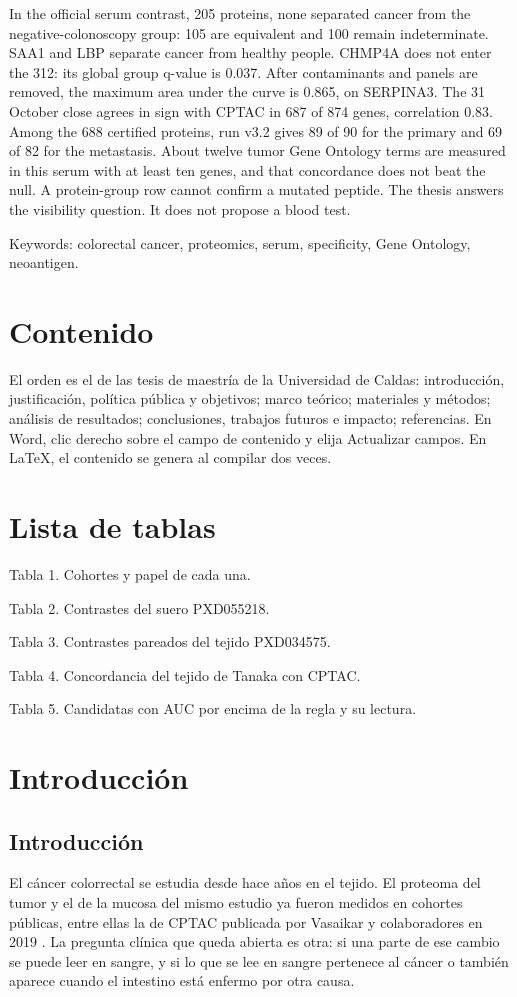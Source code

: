 \documentclass[12pt,oneside]{report}
\begin{document}
In the official serum contrast, 205 proteins, none separated cancer from the negative-colonoscopy group: 105 are equivalent and 100 remain indeterminate. SAA1 and LBP separate cancer from healthy people. CHMP4A does not enter the 312: its global group q-value is 0.037. After contaminants and panels are removed, the maximum area under the curve is 0.865, on SERPINA3. The 31 October close agrees in sign with CPTAC in 687 of 874 genes, correlation 0.83. Among the 688 certified proteins, run v3.2 gives 89 of 90 for the primary and 69 of 82 for the metastasis. About twelve tumor Gene Ontology terms are measured in this serum with at least ten genes, and that concordance does not beat the null. A protein-group row cannot confirm a mutated peptide. The thesis answers the visibility question. It does not propose a blood test.

Keywords: colorectal cancer, proteomics, serum, specificity, Gene Ontology, neoantigen.

\chapter*{Contenido}
El orden es el de las tesis de maestría de la Universidad de Caldas: introducción, justificación, política pública y objetivos; marco teórico; materiales y métodos; análisis de resultados; conclusiones, trabajos futuros e impacto; referencias. En Word, clic derecho sobre el campo de contenido y elija Actualizar campos. En LaTeX, el contenido se genera al compilar dos veces.

\chapter*{Lista de tablas}
Tabla 1. Cohortes y papel de cada una.

Tabla 2. Contrastes del suero PXD055218.

Tabla 3. Contrastes pareados del tejido PXD034575.

Tabla 4. Concordancia del tejido de Tanaka con CPTAC.

Tabla 5. Candidatas con AUC por encima de la regla y su lectura.

\chapter{Introducción}
\section{Introducción}
El cáncer colorrectal se estudia desde hace años en el tejido. El proteoma del tumor y el de la mucosa del mismo estudio ya fueron medidos en cohortes públicas, entre ellas la de CPTAC publicada por Vasaikar y colaboradores en 2019 \cite{vasaikar2019}. La pregunta clínica que queda abierta es otra: si una parte de ese cambio se puede leer en sangre, y si lo que se lee en sangre pertenece al cáncer o también aparece cuando el intestino está enfermo por otra causa.
\end{document}
